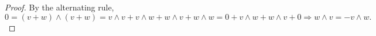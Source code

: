 \begin{proof}
  By the alternating rule,
  \begin{equation}
    0 = (v + w) \wedge (v + w)
    = v \wedge v + v \wedge w + w \wedge v + w \wedge w
    = 0 + v \wedge w + w \wedge v + 0
    \Rightarrow w \wedge v = - v \wedge w.
  \end{equation}
\end{proof}
